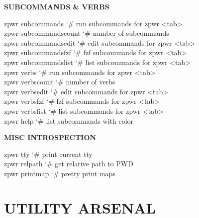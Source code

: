 \documentclass[11pt,a4paper,twoside]{book}
\begin{document}
\vspace{12pt}
{\bfseries\color{neonyellow} SUBCOMMANDS \& VERBS}\vspace{4pt}

\begin{codebox}
\color{neongreen}zpwr subcommands           {\char`\#} run subcommands for zpwr <tab>\\
\color{neongreen}zpwr subcommandscount      {\char`\#} number of subcommands\\
\color{neongreen}zpwr subcommandsedit       {\char`\#} edit subcommands for zpwr <tab>\\
\color{neongreen}zpwr subcommandsfzf        {\char`\#} fzf subcommands for zpwr <tab>\\
\color{neongreen}zpwr subcommandslist       {\char`\#} list subcommands for zpwr <tab>\\
\color{neongreen}zpwr verbs                 {\char`\#} run subcommands for zpwr <tab>\\
\color{neongreen}zpwr verbscount            {\char`\#} number of verbs\\
\color{neongreen}zpwr verbsedit             {\char`\#} edit subcommands for zpwr <tab>\\
\color{neongreen}zpwr verbsfzf              {\char`\#} fzf subcommands for zpwr <tab>\\
\color{neongreen}zpwr verbslist             {\char`\#} list subcommands for zpwr <tab>\\
\color{neongreen}zpwr help                  {\char`\#} list subcommands with color\\
\end{codebox}


\vspace{12pt}
{\bfseries\color{neonyellow} MISC INTROSPECTION}\vspace{4pt}

\begin{codebox}
\color{neongreen}zpwr tty                   {\char`\#} print current tty\\
\color{neongreen}zpwr relpath               {\char`\#} get relative path to PWD\\
\color{neongreen}zpwr printmap              {\char`\#} pretty print maps\\
\end{codebox}


\vspace{16pt}


\chapter{UTILITY ARSENAL}
\end{document}
